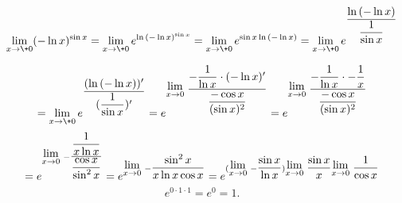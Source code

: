 {}

$$
  \lim_{x\to\+0} (-\ln{x})^{\sin{x}}
= \lim_{x\to\+0} e^{\ln{(-\ln{x})^{\sin{x}}}}
= \lim_{x\to\+0} e^{\sin{x} \ln{(-\ln{x})} }
= \lim_{x\to\+0} e^{\dfrac{\ln{(-\ln{x})}}{\dfrac{1}{\sin{x}}}}
$$

$$
= \lim_{x\to\+0} e^{\dfrac{(\ln{(-\ln{x})})'}{(\dfrac{1}{\sin{x}})'}}
= e^{\Lim{x\to0}{\dfrac{-\dfrac{1}{\ln{x}}\cdot{(-\ln{x})'}}{\dfrac{-\cos{x}}{(\sin{x})^2}}}}
= e^{\Lim{x\to0}{ \dfrac{-\dfrac{1}{\ln{x}}\cdot{-\dfrac{1}{x}}}{\dfrac{-\cos{x}}{(\sin{x})^2}} }}
$$
$$
= e^{\Lim{x\to 0}{ -\dfrac{\dfrac{1}{x\ln{x}}}{ \dfrac{\cos{x}}{\sin^2{x}} } }}
= e^{\Lim{x\to{0}}{-\dfrac{\sin^2{x}}{x\ln{x}\cos{x}}}}
= e^{(\Lim{x\to{0}}{-\dfrac{\sin{x}}{\ln{x}}}){\Lim{x\to{0}}{\dfrac{\sin{x}}{x}}}{\Lim{x\to{0}}{\dfrac{1}{\cos{x}}}}}
$$
$$
  e^{0 \cdot 1 \cdot 1} = e^0 = 1.
$$
